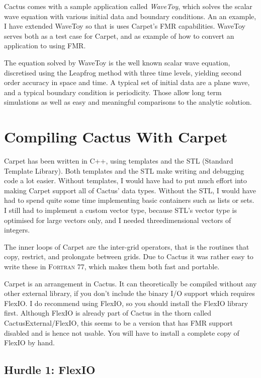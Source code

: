 Cactus comes with a sample application called \emph{WaveToy}, which
solves the scalar wave equation with various initial data and boundary
conditions.  An an example, I have extended WaveToy so that is uses
Carpet's FMR capabilities.  WaveToy serves both as a test case for
Carpet, and as example of how to convert an application to using FMR.

The equation solved by WaveToy is the well known scalar wave equation,
discretised using the Leapfrog method with three time levels, yielding
second order accuracy in space and time.  A typical set of initial
data are a plane wave, and a typical boundary condition is
periodicity.  Those allow long term simulations as well as easy and
meaningful comparisons to the analytic solution.



\section{Compiling Cactus With Carpet}

Carpet has been written in C++, using templates and the STL (Standard
Template Library).  Both templates and the STL make writing and
debugging code a lot easier.  Without templates, I would have had to
put much effort into making Carpet support all of Cactus' data types.
Without the STL, I would have had to spend quite some time
implementing basic containers such as lists or sets.  I still had to
implement a custom vector type, because STL's vector type is optimised
for large vectors only, and I needed threedimensional vectors of
integers.

The inner loops of Carpet are the inter-grid operators, that is the
routines that copy, restrict, and prolongate between grids.  Due to
Cactus it was rather easy to write these in \textsc{Fortran 77}, which
makes them both fast and portable.

Carpet is an arrangement in Cactus.  It can theoretically be compiled
without any other external library, if you don't include the binary
I/O support which requires FlexIO.  I do recommend using FlexIO, so
you should install the FlexIO library first.  Although FlexIO is
already part of Cactus in the thorn called CactusExternal/FlexIO, this
seems to be a version that has FMR support disabled and is hence not
usable.  You will have to install a complete copy of FlexIO by hand.

\subsection{Hurdle 1: FlexIO}

